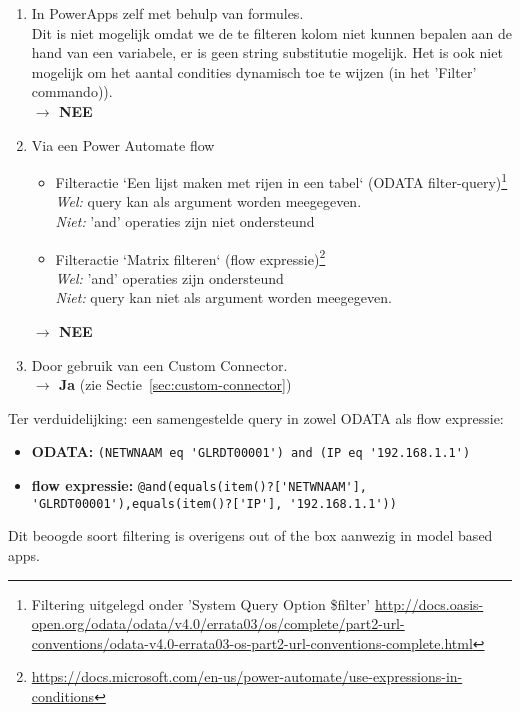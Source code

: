 \begin{enumerate}
    \item In PowerApps zelf met behulp van formules.\\
    Dit is niet mogelijk omdat we de te filteren kolom niet kunnen bepalen aan de hand van een variabele, er is geen string substitutie mogelijk. Het is ook niet mogelijk om het aantal condities dynamisch toe te wijzen (in het 'Filter' commando)).\\
    \textbf{$\rightarrow$ NEE}
    \item Via een Power Automate flow
    \begin{itemize}
        \item Filteractie `Een lijst maken met rijen in een tabel` (ODATA filter-query)\footnote{Filtering uitgelegd onder 'System Query Option \$filter' \url{http://docs.oasis-open.org/odata/odata/v4.0/errata03/os/complete/part2-url-conventions/odata-v4.0-errata03-os-part2-url-conventions-complete.html}}\\ 
            \textit{Wel:}  query kan als argument worden meegegeven.\\
            \textit{Niet:} 'and' operaties zijn niet ondersteund
         \item Filteractie `Matrix filteren` (flow expressie)\footnote{\url{https://docs.microsoft.com/en-us/power-automate/use-expressions-in-conditions}}\\
            \textit{Wel:} 'and' operaties zijn ondersteund\\
            \textit{Niet:} query kan niet als argument worden meegegeven.
    \end{itemize}
    \textbf{$\rightarrow$ NEE}
    \item Door gebruik van een Custom Connector.\\
    \textbf{$\rightarrow$ Ja}
    (zie Sectie~\ref{sec:custom-connector})
\end{enumerate}

Ter verduidelijking: een samengestelde query in zowel ODATA als flow expressie:
\begin{itemize}
    \item \textbf{ODATA:} \lstinline|(NETWNAAM eq 'GLRDT00001') and (IP eq '192.168.1.1')|
    \item \textbf{flow expressie:} \lstinline|@and(equals(item()?['NETWNAAM'], 'GLRDT00001'),equals(item()?['IP'], '192.168.1.1'))|
\end{itemize}

Dit beoogde soort filtering is overigens out of the box aanwezig in model based apps. \autocite{MicrosoftDocs2020c}

